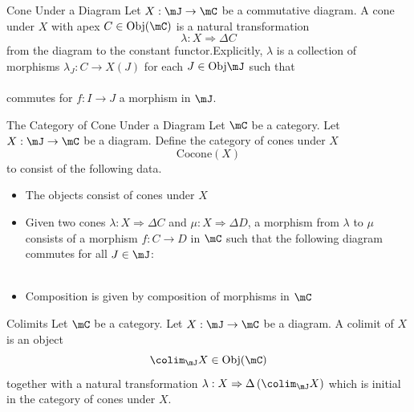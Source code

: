 \documentclass[a4paper]{article}
\begin{document}
\begin{defn}{Cone Under a Diagram}{} Let $X:\mJ\to\mC$ be a commutative diagram. A cone under $X$ with apex $C\in\text{Obj}(\mC)$ is a natural transformation $$\lambda:X\Rightarrow\Delta C$$ from the diagram to the constant functor.Explicitly, $\lambda$ is a collection of morphisms $\lambda_J:C\to X(J)$ for each $J\in\text{Obj}\mJ$ such that \\
\\
commutes for $f:I\to J$ a morphism in $\mJ$.  
\end{defn}

\begin{defn}{The Category of Cone Under a Diagram}{} Let $\mC$ be a category. Let $X:\mJ\to\mC$ be a diagram. Define the category of cones under $X$ $$\text{Cocone}(X)$$ to consist of the following data. 
\begin{itemize}
\item The objects consist of cones under $X$
\item Given two cones $\lambda:X\Rightarrow\Delta C$ and $\mu:X\Rightarrow\Delta D$, a morphism from $\lambda$ to $\mu$ consists of a morphism $f:C\to D$ in $\mC$ such that the following diagram commutes for all $J\in\mJ$: \\
\\
\item Composition is given by composition of morphisms in $\mC$
\end{itemize}
\end{defn}

\begin{defn}{Colimits}{} Let $\mC$ be a category. Let $X:\mJ\to\mC$ be a diagram. A colimit of $X$ is an object $$\colim_\mJ X\in\text{Obj}(\mC)$$ together with a natural transformation $\lambda:X\Rightarrow\Delta\left(\colim_\mJ X\right)$ which is initial in the category of cones under $X$. 
\end{defn}
\end{document}
